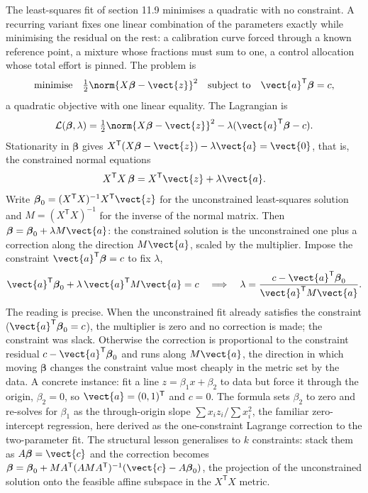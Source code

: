 The least-squares fit of section 11.9 minimises a quadratic with no
constraint. A recurring variant fixes one linear combination of the
parameters exactly while minimising the residual on the rest: a
calibration curve forced through a known reference point, a mixture
whose fractions must sum to one, a control allocation whose total
effort is pinned. The problem is
\[
\text{minimise}\quad \tfrac{1}{2}\norm{X\boldsymbol{\beta} -
\vect{z}}^{2}\quad\text{subject to}\quad
\vect{a}^{\mathsf{T}}\boldsymbol{\beta} = c,
\]
a quadratic objective with one linear equality. The Lagrangian is
\[
\mathcal{L}(\boldsymbol{\beta}, \lambda) =
\tfrac{1}{2}\norm{X\boldsymbol{\beta} - \vect{z}}^{2} -
\lambda(\vect{a}^{\mathsf{T}}\boldsymbol{\beta} - c).
\]
Stationarity in $\boldsymbol{\beta}$ gives $X^{\mathsf{T}}(X
\boldsymbol{\beta} - \vect{z}) - \lambda\vect{a} = \vect{0}$, that
is, the constrained normal equations
\[
X^{\mathsf{T}}X\,\boldsymbol{\beta} = X^{\mathsf{T}}\vect{z} +
\lambda\vect{a}.
\]
Write $\boldsymbol{\beta}_{0} = (X^{\mathsf{T}}X)^{-1}X^{\mathsf{T}}
\vect{z}$ for the unconstrained least-squares solution and $M =
(X^{\mathsf{T}}X)^{-1}$ for the inverse of the normal matrix. Then
$\boldsymbol{\beta} = \boldsymbol{\beta}_{0} + \lambda M\vect{a}$:
the constrained solution is the unconstrained one plus a correction
along the direction $M\vect{a}$, scaled by the multiplier. Impose
the constraint $\vect{a}^{\mathsf{T}}\boldsymbol{\beta} = c$ to fix
$\lambda$,
\[
\vect{a}^{\mathsf{T}}\boldsymbol{\beta}_{0} + \lambda\,
\vect{a}^{\mathsf{T}} M\vect{a} = c
\quad\Longrightarrow\quad
\lambda = \frac{c - \vect{a}^{\mathsf{T}}\boldsymbol{\beta}_{0}}
{\vect{a}^{\mathsf{T}} M\vect{a}}.
\]
The reading is precise. When the unconstrained fit already satisfies
the constraint ($\vect{a}^{\mathsf{T}}\boldsymbol{\beta}_{0} = c$),
the multiplier is zero and no correction is made; the constraint was
slack. Otherwise the correction is proportional to the constraint
residual $c - \vect{a}^{\mathsf{T}}\boldsymbol{\beta}_{0}$ and runs
along $M\vect{a}$, the direction in which moving $\boldsymbol{\beta}$
changes the constraint value most cheaply in the metric set by the
data. A concrete instance: fit a line $z = \beta_{1} x + \beta_{2}$
to data but force it through the origin, $\beta_{2} = 0$, so $\vect{a}
= (0, 1)^{\mathsf{T}}$ and $c = 0$. The formula sets $\beta_{2}$ to
zero and re-solves for $\beta_{1}$ as the through-origin slope
$\sum x_{i} z_{i}/\sum x_{i}^{2}$, the familiar zero-intercept
regression, here derived as the one-constraint Lagrange correction
to the two-parameter fit. The structural lesson generalises to
$k$ constraints: stack them as $A\boldsymbol{\beta} = \vect{c}$ and
the correction becomes $\boldsymbol{\beta} = \boldsymbol{\beta}_{0}
+ M A^{\mathsf{T}}(A M A^{\mathsf{T}})^{-1}(\vect{c} -
A\boldsymbol{\beta}_{0})$, the projection of the unconstrained
solution onto the feasible affine subspace in the $X^{\mathsf{T}}X$
metric.

